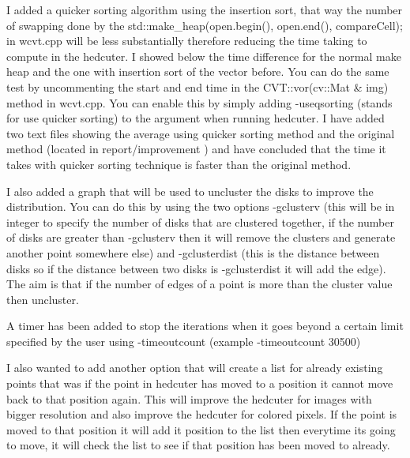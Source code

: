 \documentclass[11pt,a4paper]{article}
\begin{document}
I added a quicker sorting algorithm using the insertion sort, that way
the number of swapping done by the std::make\_heap(open.begin(),
open.end(), compareCell); in wcvt.cpp will be less substantially
therefore reducing the time taking to compute in the hedcuter. I showed
below the time difference for the normal make heap and the one with
insertion sort of the vector before. You can do the same test by
uncommenting the start and end time in the CVT::vor(cv::Mat \& img)
method in wcvt.cpp. You can enable this by simply adding -useqsorting
(stands for use quicker sorting) to the argument when running hedcuter.
I have added two text files showing the average using quicker sorting method and the original method
(located in report/improvement ) and have concluded that the time it takes with quicker sorting technique is faster than the original method.


I also added a graph that will be used to uncluster the disks to improve
the distribution. You can do this by using the two options -gclusterv
(this will be in integer to specify the number of disks that are
clustered together, if the number of disks are greater than -gclusterv
then it will remove the clusters and generate another point somewhere
else) and -gclusterdist (this is the distance between disks so if the
distance between two disks is -gclusterdist it will add the edge). The
aim is that if the number of edges of a point is more than the cluster
value then uncluster.

A timer has been added to stop the iterations when it goes beyond a certain limit specified by the user
using -timeout\textunderscore count (example -timeout\textunderscore count 30500)

I also wanted to add another option that will create a list for already
existing points that was if the point in hedcuter has moved to a
position it cannot move back to that position again. This will improve
the hedcuter for images with bigger resolution and also improve the
hedcuter for colored pixels. If the point is moved to that position it
will add it position to the list then everytime its going to move, it
will check the list to see if that position has been moved to already.



\end{document}
